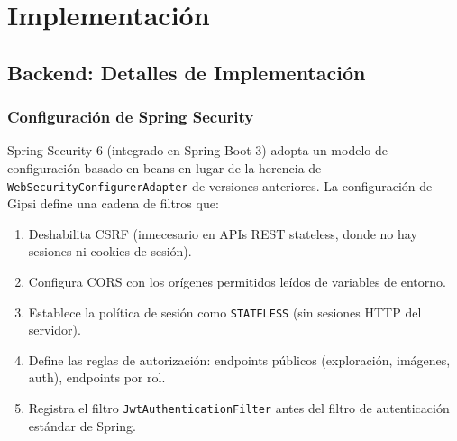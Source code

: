 \documentclass[12pt,a4paper,twoside]{report}
\begin{document}
\chapter{Implementación}

\section{Backend: Detalles de Implementación}

\subsection{Configuración de Spring Security}

Spring Security 6 (integrado en Spring Boot 3) adopta un modelo de configuración basado en beans en lugar de la herencia de \texttt{WebSecurityConfigurerAdapter} de versiones anteriores. La configuración de Gipsi define una cadena de filtros que:

\begin{enumerate}
  \item Deshabilita CSRF (innecesario en APIs REST stateless, donde no hay sesiones ni cookies de sesión).
  \item Configura CORS con los orígenes permitidos leídos de variables de entorno.
  \item Establece la política de sesión como \texttt{STATELESS} (sin sesiones HTTP del servidor).
  \item Define las reglas de autorización: endpoints públicos (exploración, imágenes, auth), endpoints por rol.
  \item Registra el filtro \texttt{JwtAuthenticationFilter} antes del filtro de autenticación estándar de Spring.
\end{enumerate}
\end{document}
